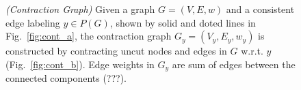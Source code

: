 \begin{center}
\begin{figure}[h]
\caption{\emph{(Contraction Graph)} 
Given a graph $G=(V, E, w)$ and a consistent edge labeling $y\in P(G)$, shown by solid and doted lines in Fig.~\ref{fig:cont_a}, the contraction 
graph  $G_y=(V_y,E_y, w_y) $ is constructed by contracting uncut nodes and edges in $G$ w.r.t. $y$ (Fig.~\ref{fig:cont_b}).
Edge weights in $G_y$ are sum of edges between the connected components (???).
}\label{fig:contraction}
\end{figure}
\end{center}



